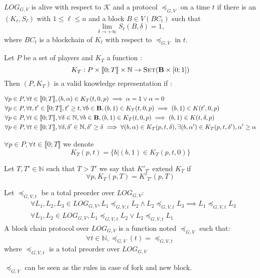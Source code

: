 $LOG_{G,V}$ is alive with respect to $\mathcal K$ and a protocol $\preceq_{G,V}$ on a time $t$
if there is an $(K_\ell,S_\ell)$ with $1 \leq \ell \leq n$ 
and a block $B \in V(BC_t)$ such that 
$$\lim\limits_{\delta\rightarrow +\infty}S_\ell(B,\delta) = 1, $$
where $BC_t$ is a blockchain of $K_\ell$ with respect to $\preceq_{G,V}$ in $t$.

\begin{mydef}
Let $P$ be a set of players and $K_T$ a function :
$$K_{T} : P \times \llbracket 0;T \rrbracket \times \mathbb{N} \rightarrow \text{\sc Set}(\text{\bf B} \times [0;1])$$ 
Then $(P,K_{T})$ is a valid knowledge representation if :

\begin{eqnarray*}
&\forall p \in P,\forall t\in \llbracket 0;T \rrbracket, (b,\alpha) \in K_{T}(t,0,p) \implies \alpha = 1 \lor \alpha = 0\\
&\forall p \in P,\forall t,t'\in \llbracket 0;T \rrbracket, t' \geq t, \forall b \in \text{\bf B},  (b,1) \in K_{T}(t,0,p) \implies (b,1) \in K(t',0,p)  \\
&\forall p \in P,\forall t\in \llbracket 0;T \rrbracket, \forall \delta \in \mathbb{N}, \forall b \in \text{\bf B},  (b,1) \in K_{T}(t,0,p) \implies (b,1) \in K(t,\delta,p) \\
&\forall p \in P,\forall t\in \llbracket 0;T \rrbracket, \forall \delta,\delta' \in \mathbb{N}, \delta' \geq \delta \implies \forall (b,\alpha) \in K_{T}(p,t,\delta), \exists (b,\alpha') \in K_{T}(p,t,\delta'), \alpha'\geq \alpha\\
\end{eqnarray*}
\end{mydef}

\begin{mynota}
	$\forall p \in P, \forall t\in \llbracket 0;T \rrbracket$ we denote $$K_{T}(p,t)=\{b | (b,1) \in K_{T}(p,t,0)\}$$
\end{mynota}

\begin{mydef}
	Let $T,T' \in \mathbb{N}$ such that $T>T'$ we say that $K'_{T'}$ extend $K_{T}$ if $$\forall p, K_{T}(p,T) = K'_{T'}(p,T)$$
\end{mydef}

\begin{mydef}
	Let $\preceq_{G,V,t}$ be  a total preorder over $LOG_{G,V}$:
\begin{eqnarray*}		
	&\forall L_1, L_2, L_3 \in LOG_{G,V}, L_1 \preceq_{G,V,t} L_2 \land L_2 \preceq_{G,V,t} L_3 \implies L_1 \preceq_{G,V,t} L_3  \\
	&\forall L_1, L_2 \in LOG_{G,V}, L_1 \preceq_{G,V,t} L_2 \lor L_2 \preceq_{G,V,t} L_1 
\end{eqnarray*}
	A block chain protocol over $LOG_{G,V}$ is a function noted $\preceq_{G,V}$ such that: $$ \forall t \in \mathbb{N}, \preceq_{G,V}(t) =  \preceq_{G,V,t}$$ where $\preceq_{G,V,t}$ is a total preorder over $LOG_{G,V}$
\end{mydef}
\begin{myrem}
	$\preceq_{G,V}$ can be seen as the rules in case of fork and new block. 
\end{myrem}

